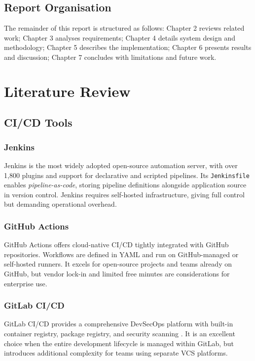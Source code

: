 \documentclass[12pt,a4paper]{report}
\begin{document}
\section{Report Organisation}
The remainder of this report is structured as follows: Chapter 2 reviews related work; Chapter 3 analyses requirements; Chapter 4 details system design and methodology; Chapter 5 describes the implementation; Chapter 6 presents results and discussion; Chapter 7 concludes with limitations and future work.

\chapter{Literature Review}

\section{CI/CD Tools}

\subsection{Jenkins}
Jenkins \cite{jenkins_docs} is the most widely adopted open-source automation server, with over 1,800 plugins and support for declarative and scripted pipelines. Its \texttt{Jenkinsfile} enables \textit{pipeline-as-code}, storing pipeline definitions alongside application source in version control. Jenkins requires self-hosted infrastructure, giving full control but demanding operational overhead.

\subsection{GitHub Actions}
GitHub Actions \cite{github_actions_docs} offers cloud-native CI/CD tightly integrated with GitHub repositories. Workflows are defined in YAML and run on GitHub-managed or self-hosted runners. It excels for open-source projects and teams already on GitHub, but vendor lock-in and limited free minutes are considerations for enterprise use.

\subsection{GitLab CI/CD}
GitLab CI/CD provides a comprehensive DevSecOps platform with built-in container registry, package registry, and security scanning \cite{gitlab_ci_docs}. It is an excellent choice when the entire development lifecycle is managed within GitLab, but introduces additional complexity for teams using separate VCS platforms.
\end{document}
